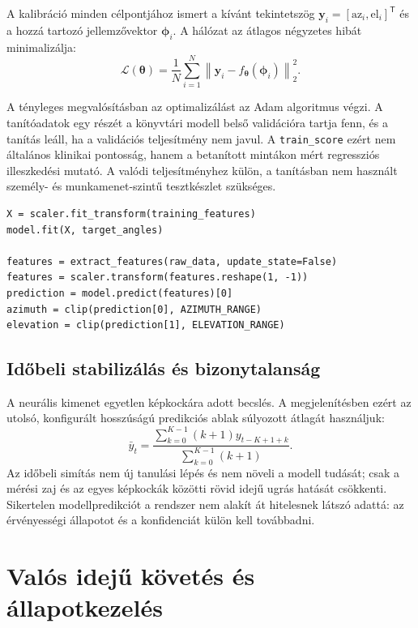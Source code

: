 \documentclass[12pt,a4paper,oneside]{book}
\begin{document}
A kalibráció minden célpontjához ismert a kívánt tekintetszög $\mathbf{y}_i=[\mathrm{az}_i,\mathrm{el}_i]^\mathsf{T}$ és a hozzá tartozó jellemzővektor $\boldsymbol{\phi}_i$. A hálózat az átlagos négyzetes hibát minimalizálja:
{\large
\begin{equation}
\mathcal{L}(\boldsymbol{\theta}) =
\frac{1}{N}\sum_{i=1}^{N}
\left\|\mathbf{y}_i-
f_{\boldsymbol{\theta}}(\boldsymbol{\phi}_i)\right\|_2^2.
\end{equation}
}%

A tényleges megvalósításban az optimalizálást az Adam algoritmus végzi. A tanítóadatok egy részét a könyvtári modell belső validációra tartja fenn, és a tanítás leáll, ha a validációs teljesítmény nem javul. A \texttt{train\_score} ezért nem általános klinikai pontosság, hanem a betanított mintákon mért regressziós illeszkedési mutató. A valódi teljesítményhez külön, a tanításban nem használt személy- és munkamenet-szintű tesztkészlet szükséges.

\begin{lstlisting}[caption={A tanítási és predikciós lépések fogalmi magja},label={lst:mlp_training}]
X = scaler.fit_transform(training_features)
model.fit(X, target_angles)

features = extract_features(raw_data, update_state=False)
features = scaler.transform(features.reshape(1, -1))
prediction = model.predict(features)[0]
azimuth = clip(prediction[0], AZIMUTH_RANGE)
elevation = clip(prediction[1], ELEVATION_RANGE)
\end{lstlisting}

\subsection{Időbeli stabilizálás és bizonytalanság}

A neurális kimenet egyetlen képkockára adott becslés. A megjelenítésben ezért az utolsó, konfigurált hosszúságú predikciós ablak súlyozott átlagát használjuk:
{\large
\begin{equation}
\bar{y}_t =
\frac{\sum_{k=0}^{K-1}(k+1)y_{t-K+1+k}}
{\sum_{k=0}^{K-1}(k+1)}.
\end{equation}
}%
Az időbeli simítás nem új tanulási lépés és nem növeli a modell tudását; csak a mérési zaj és az egyes képkockák közötti rövid idejű ugrás hatását csökkenti. Sikertelen modellpredikciót a rendszer nem alakít át hitelesnek látszó adattá: az érvényességi állapotot és a konfidenciát külön kell továbbadni.

\section{Valós idejű követés és állapotkezelés}
\end{document}
